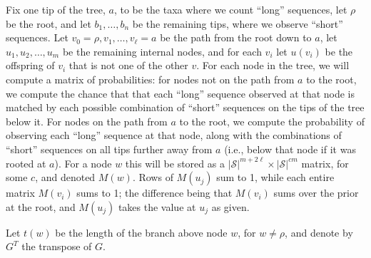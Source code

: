 \documentclass{article}
\newcommand{\calS}{\mathcal{S}}  %
\theoremstyle{plain}
\theoremstyle{definition}
\begin{document}
Fix one tip of the tree, $a$, to be the taxa where we count ``long'' sequences, let $\rho$ be the root, and let $b_1, \ldots, b_n$ be the remaining tips,
where we observe ``short'' sequences.
Let $v_0=\rho, v_1, \ldots, v_\ell = a$ be the path from the root down to $a$,
let $u_1, u_2, \ldots, u_m$ be the remaining internal nodes,
and for each $v_i$ let $u(v_i)$ be the offspring of $v_i$ that is not one of the other $v$.
For each node in the tree,
we will compute a matrix of probabilities:
for nodes not on the path from $a$ to the root,
we compute the chance that that each ``long'' sequence observed at that node
is matched by each possible combination of ``short'' sequences on the tips of the tree below it.
For nodes on the path from $a$ to the root, we compute the probability of observing
each ``long'' sequence at that node, along with the combinations of ``short'' sequences
on all tips further away from $a$ (i.e., below that node if it was rooted at $a$).
For a node $w$ this will be stored as a $|\calS|^{m+2\ell} \times |\calS|^{cm}$ matrix, for some $c$,
and denoted $M(w)$.
Rows of $M(u_j)$ sum to 1,
while each entire matrix $M(v_i)$ sums to 1;
the difference being that $M(v_i)$ sums over the prior at the root,
and $M(u_j)$ takes the value at $u_j$ as given.

Let $t(w)$ be the length of the branch above node $w$, for $w \neq \rho$,
and denote by $G^T$ the transpose of $G$.
\end{document}
